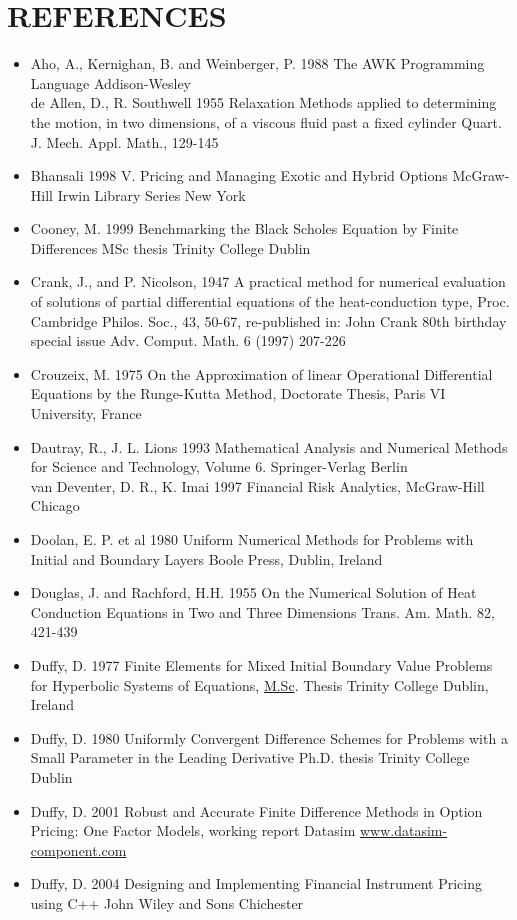 \documentclass[10pt]{article}
\begin{document}
\section*{REFERENCES}
\begin{itemize}
  \item Aho, A., Kernighan, B. and Weinberger, P. 1988 The AWK Programming Language Addison-Wesley\\
de Allen, D., R. Southwell 1955 Relaxation Methods applied to determining the motion, in two dimensions, of a viscous fluid past a fixed cylinder Quart. J. Mech. Appl. Math., 129-145
  \item Bhansali 1998 V. Pricing and Managing Exotic and Hybrid Options McGraw-Hill Irwin Library Series New York
  \item Cooney, M. 1999 Benchmarking the Black Scholes Equation by Finite Differences MSc thesis Trinity College Dublin
  \item Crank, J., and P. Nicolson, 1947 A practical method for numerical evaluation of solutions of partial differential equations of the heat-conduction type, Proc. Cambridge Philos. Soc., 43, 50-67, re-published in: John Crank 80th birthday special issue Adv. Comput. Math. 6 (1997) 207-226
  \item Crouzeix, M. 1975 On the Approximation of linear Operational Differential Equations by the Runge-Kutta Method, Doctorate Thesis, Paris VI University, France
  \item Dautray, R., J. L. Lions 1993 Mathematical Analysis and Numerical Methods for Science and Technology, Volume 6. Springer-Verlag Berlin\\
van Deventer, D. R., K. Imai 1997 Financial Risk Analytics, McGraw-Hill Chicago
  \item Doolan, E. P. et al 1980 Uniform Numerical Methods for Problems with Initial and Boundary Layers Boole Press, Dublin, Ireland
  \item Douglas, J. and Rachford, H.H. 1955 On the Numerical Solution of Heat Conduction Equations in Two and Three Dimensions Trans. Am. Math. 82, 421-439
  \item Duffy, D. 1977 Finite Elements for Mixed Initial Boundary Value Problems for Hyperbolic Systems of Equations, \href{http://M.Sc}{M.Sc}. Thesis Trinity College Dublin, Ireland
  \item Duffy, D. 1980 Uniformly Convergent Difference Schemes for Problems with a Small Parameter in the Leading Derivative Ph.D. thesis Trinity College Dublin
  \item Duffy, D. 2001 Robust and Accurate Finite Difference Methods in Option Pricing: One Factor Models, working report Datasim \href{http://www.datasim-component.com}{www.datasim-component.com}
  \item Duffy, D. 2004 Designing and Implementing Financial Instrument Pricing using C++ John Wiley and Sons Chichester
\end{itemize}
\end{document}

